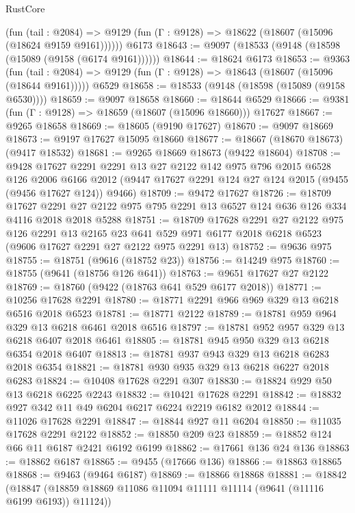 \begin{lexlean}{RustCore}
\begin{coremodule}
      (fun (tail : @2084) =>
      @9129 (fun (Γ : @9128) => @18622 (@18607 (@15096 (@18624 @9159 @9161))))))
    @6173
@18643 := @9097 (@18533 (@9148 (@18598 (@15089 (@9158 (@6174 @9161))))))
@18644 := @18624 @6173
@18653 := @9363
    (fun (tail : @2084) => @9129 (fun (Γ : @9128) => @18643 (@18607 (@15096 (@18644 @9161)))))
    @6529
@18658 := @18533 (@9148 (@18598 (@15089 (@9158 @6530))))
@18659 := @9097 @18658
@18660 := @18644 @6529
@18666 := @9381 (fun (Γ : @9128) => @18659 (@18607 (@15096 @18660))) @17627
@18667 := @9265 @18658
@18669 := @18605 (@9190 @17627)
@18670 := @9097 @18669
@18673 := @9197 @17627 @15095 @18660
@18677 := @18667 (@18670 @18673) (@9417 @18532)
@18681 := @9265 @18669 @18673 (@9422 @18604)
@18708 := @9428
    @17627
    @2291
    @2291
    @13
    @27
    @2122
    @142
    @975
    @796
    @2015
    @6528
    @126
    @2006
    @6166
    @2012
    (@9447 @17627 @2291 @124 @27 @124 @2015 (@9455 (@9456 @17627 @124)) @9466)
@18709 := @9472 @17627
@18726 := @18709
    @17627
    @2291
    @27
    @2122
    @975
    @795
    @2291
    @13
    @6527
    @124
    @636
    @126
    @334
    @4116
    @2018
    @2018
    @5288
@18751 := @18709
    @17628
    @2291
    @27
    @2122
    @975
    @126
    @2291
    @13
    @2165
    @23
    @641
    @529
    @971
    @6177
    @2018
    @6218
    @6523
    (@9606 @17627 @2291 @27 @2122 @975 @2291 @13)
@18752 := @9636 @975
@18755 := @18751 (@9616 (@18752 @23))
@18756 := @14249 @975
@18760 := @18755 (@9641 (@18756 @126 @641))
@18763 := @9651 @17627 @27 @2122
@18769 := @18760 (@9422 (@18763 @641 @529 @6177 @2018))
@18771 := @10256 @17628 @2291
@18780 := @18771 @2291 @966 @969 @329 @13 @6218 @6516 @2018 @6523
@18781 := @18771 @2122
@18789 := @18781 @959 @964 @329 @13 @6218 @6461 @2018 @6516
@18797 := @18781 @952 @957 @329 @13 @6218 @6407 @2018 @6461
@18805 := @18781 @945 @950 @329 @13 @6218 @6354 @2018 @6407
@18813 := @18781 @937 @943 @329 @13 @6218 @6283 @2018 @6354
@18821 := @18781 @930 @935 @329 @13 @6218 @6227 @2018 @6283
@18824 := @10408 @17628 @2291 @307
@18830 := @18824 @929 @50 @13 @6218 @6225 @2243
@18832 := @10421 @17628 @2291
@18842 := @18832 @927 @342 @11 @49 @6204 @6217 @6224 @2219 @6182 @2012
@18844 := @11026 @17628 @2291
@18847 := @18844 @927 @11 @6204
@18850 := @11035 @17628 @2291 @2122
@18852 := @18850 @209 @23
@18859 := @18852 @124 @66 @11 @6187 @2421 @6192 @6199
@18862 := @17661 @136 @24 @136
@18863 := @18862 @6187
@18865 := @9455 (@17666 @136)
@18866 := @18863 @18865
@18868 := @9463 (@9464 @6187)
@18869 := @18866 @18868
@18881 := @18842
    (@18847 (@18859 @18869 @11086 @11094 @11111 @11114 (@9641 (@11116 @6199 @6193)) @11124))

\end{coremodule}
\end{lexlean}
